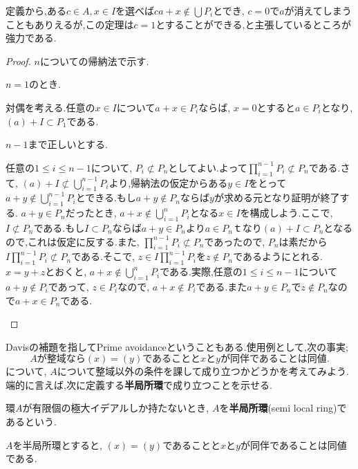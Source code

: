 定義から,ある$c\in A,x\in I$を選べば$ca+x\not\in\bigcup P_i$とでき, $c=0$で$a$が消えてしまうこともありえるが,この定理は$c=1$とすることができる,と主張しているところが強力である.

\begin{proof}
	$n$についての帰納法で示す.
	
	\begin{step}
		\item $n=1$のとき.
		
		対偶を考える.任意の$x\in I$について$a+x\in P_i$ならば, $x=0$とすると$a\in P_i$となり, $(a)+I\subset P_1$である.
		
		\item $n-1$まで正しいとする.
		
		任意の$1\leq i\leq n-1$について, $P_i\not\subset P_n$としてよい.よって$\prod_{i=1}^{n-1}P_i\not\subset P_n$である.さて, $(a)+I\not\subset\bigcup_{i=1}^{n-1}P_i$より,帰納法の仮定からある$y\in I$をとって$a+y\not\in\bigcup_{i=1}^{n-1}P_i$とできる.もし$a+y\not\in P_n$ならば$y$が求める元となり証明が終了する. $a+y\in P_n$だったとき, $a+x\not\in \bigcup_{i=1}^n P_i$となる$x\in I$を構成しよう.ここで, $I\not\subset P_n$である.もし$I\subset P_n$ならば$a+y\in P_n$より$a\in P_n$ｔなり$(a)+I\subset P_n$となるので,これは仮定に反する.また, $\prod_{i=1}^{n-1}P_i\not\subset P_n$であったので, $P_n$は素だから$I\prod_{i=1}^{n-1}P_i\not\subset P_n$である.そこで, $z\in I\prod_{i=1}^{n-1}P_i$を$z\not\in P_n$であるようにとれる. $x=y+z$とおくと, $a+x\not\in\bigcup_{i=1}^n P_i$である.実際,任意の$1\leq i\leq n-1$について$a+y\not\in P_i$であって, $z\in P_i$なので, $a+x\not\in P_i$である.また$a+y\in P_n$で$z\not\in P_n$なので$a+x\in P_n$である.	
	\end{step}
\end{proof}

Davisの補題を指してPrime avoidanceということもある.使用例として,次の事実;
\[A\text{が整域なら}(x)=(y)\text{であることと}x\text{と}y\text{が同伴であることは同値.}\]
について, $A$について整域以外の条件を課して成り立つかどうかを考えてみよう.端的に言えば,次に定義する\textbf{半局所環}で成り立つことを示せる.

\begin{defi}[半局所環]\label{defi:半局所環}
	環$A$が有限個の極大イデアルしか持たないとき, $A$を\textbf{半局所環}(semi local ring)であるという.
\end{defi}

\begin{prop}\label{prop:半局所環と同伴関係}
	$A$を半局所環とすると, $(x)=(y)$であることと$x$と$y$が同伴であることは同値である.
\end{prop}

